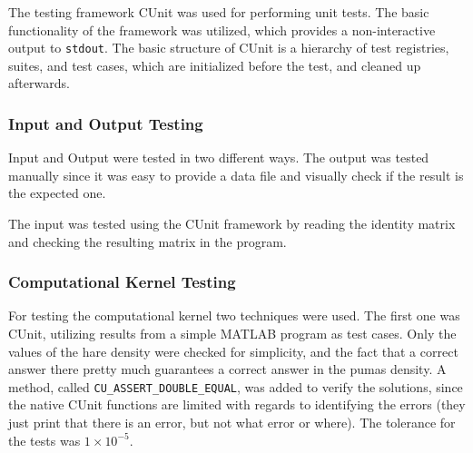 \documentclass[12pt,a4paper]{article}
\begin{document}

The testing framework CUnit was used for performing unit tests. The basic functionality of the framework was utilized, which provides a non-interactive output to \texttt{stdout}. The basic structure of CUnit is a hierarchy of test registries, suites, and test cases, which are initialized before the test, and cleaned up afterwards.




\subsubsection{Input and Output Testing}

Input and Output were tested in two different ways. The output was tested manually since it was easy to provide a data file and visually check if the result is the expected one. 

The input was tested using the CUnit framework by reading the identity matrix and checking the resulting matrix in the program. 



\subsubsection{Computational Kernel Testing}


For testing the computational kernel two techniques were used. The first one was CUnit, utilizing results from a simple MATLAB program as test cases. Only the values of the hare density were checked for simplicity, and the fact that a correct answer there pretty much guarantees a correct answer in the pumas density. A method, called \texttt{CU\_ASSERT\_DOUBLE\_EQUAL}, was added to verify the solutions, since the native CUnit functions are limited with regards to identifying the errors (they just print that there is an error, but not what error or where). The tolerance for the tests was $1 \times 10^{-5}$.
\end{document}
